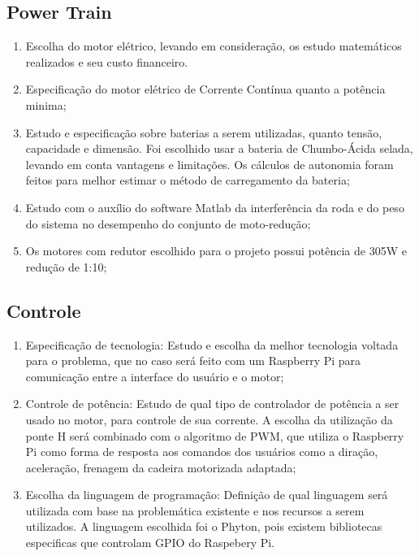   \subsection{Power Train}
    \begin{enumerate}
      \item Escolha do motor elétrico, levando em consideração, os estudo matemáticos realizados e seu custo financeiro.
      \item Especificação do motor elétrico de Corrente Contínua quanto a potência minima;
      \item Estudo e especificação sobre baterias a serem utilizadas, quanto tensão, capacidade e dimensão. Foi escolhido usar a bateria de Chumbo-Ácida selada, levando em conta vantagens e limitações. Os cálculos de autonomia foram feitos para melhor estimar o método de carregamento da bateria;

    	\item Estudo com o auxílio do software Matlab da interferência da roda e do peso do sistema no desempenho do conjunto de moto-redução;
      \item Os motores com redutor escolhido para o projeto possui potência de 305W e redução de 1:10;

    \end{enumerate}

    \subsection{Controle}
      \begin{enumerate}
        \item Especificação de tecnologia: Estudo e escolha da melhor tecnologia voltada para o problema, que no caso será feito com um Raspberry Pi para comunicação entre a interface do usuário e o motor;

        \item Controle de potência: Estudo de qual tipo de controlador de potência a ser usado no motor, para controle de sua corrente. A escolha da utilização da ponte H será combinado com o algoritmo de PWM, que utiliza o Raspberry Pi como forma de resposta aos comandos dos usuários como a diração, aceleração, frenagem da cadeira motorizada adaptada;

        \item Escolha da linguagem de programação: Definição de qual linguagem será utilizada com base na problemática existente e nos recursos a serem utilizados. A linguagem escolhida foi o Phyton, pois existem bibliotecas especificas que controlam GPIO do Raspebery Pi.

      \end{enumerate}

